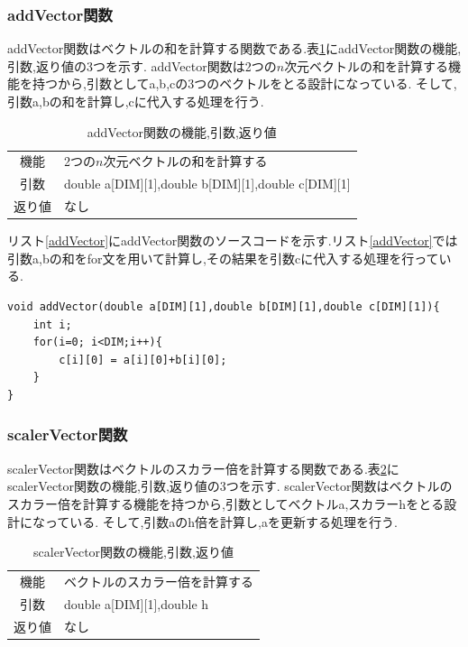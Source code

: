 \documentclass[a4j]{jarticle}
\begin{document}
      \subsubsection{addVector関数}
      addVector関数はベクトルの和を計算する関数である.表\ref{addVectortable}にaddVector関数の機能,引数,返り値の3つを示す.
      addVector関数は2つの$n$次元ベクトルの和を計算する機能を持つから,引数としてa,b,cの3つのベクトルをとる設計になっている.
      そして,引数a,bの和を計算し,cに代入する処理を行う.
        \begin{table}[H]
          \caption{addVector関数の機能,引数,返り値}
          \label{addVectortable}
          \begin{center}
              \begin{tabular}{c|l}\hline
                機能 & 2つの$n$次元ベクトルの和を計算する\\
                引数 & double a[DIM][1],double b[DIM][1],double c[DIM][1] \\
                返り値 & なし\\ \hline
              \end{tabular}
          \end{center}
          \end{table}

          リスト\ref{addVector}にaddVector関数のソースコードを示す.リスト\ref{addVector}では
        引数a,bの和をfor文を用いて計算し,その結果を引数cに代入する処理を行っている.
    \begin{lstlisting}[basicstyle=\ttfamily\footnotesize, frame=single,label=addVector,caption=addVector関数のコード]
void addVector(double a[DIM][1],double b[DIM][1],double c[DIM][1]){
    int i;
    for(i=0; i<DIM;i++){
        c[i][0] = a[i][0]+b[i][0];
    }
}
    \end{lstlisting}

      \subsubsection{scalerVector関数}
      scalerVector関数はベクトルのスカラー倍を計算する関数である.表\ref{scalerVectortable}にscalerVector関数の機能,引数,返り値の3つを示す.
      scalerVector関数はベクトルのスカラー倍を計算する機能を持つから,引数としてベクトルa,スカラーhをとる設計になっている.
      そして,引数aのh倍を計算し,aを更新する処理を行う.
        \begin{table}[H]
          \caption{scalerVector関数の機能,引数,返り値}
          \label{scalerVectortable}
          \begin{center}
              \begin{tabular}{c|l}\hline
                機能 & ベクトルのスカラー倍を計算する\\
                引数 & double a[DIM][1],double h \\
                返り値 & なし\\ \hline
              \end{tabular}
          \end{center}
          \end{table}
\end{document}
